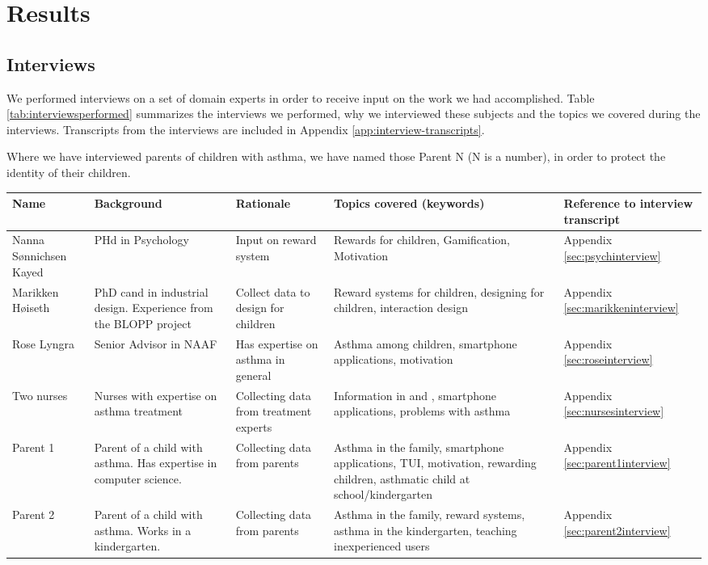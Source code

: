 \chapter{Results}
\label{chp:results}

\section{Interviews}
\label{sec:interviewresults}

We performed interviews on a set of domain experts in order to receive input on the work we had accomplished. Table \ref{tab:interviewsperformed} summarizes the interviews we performed, why we interviewed these subjects and the topics we covered during the interviews. Transcripts from the interviews are included in Appendix \ref{app:interview-transcripts}. 


Where we have interviewed parents of children with asthma, we have named those Parent N (N is a number), in order to protect the identity of their children.  

\begin{sidewaystable}
\centering
\begin{tabular}{| p{3.0cm} | p{4.0cm} | p{3.5cm} | p{6.0cm} | p{2.5cm} |}
	\hline
	\textbf{Name} & \textbf{Background} & \textbf{Rationale} & \textbf{Topics covered (keywords)} & \textbf{Reference to interview transcript} \\
	\hline
	Nanna S\o nnichsen Kayed & PHd in Psychology & Input on reward system & Rewards for children, Gamification, Motivation & Appendix \ref{sec:psychinterview} \\
	\hline
	Marikken H\o iseth & PhD cand in industrial design. Experience from the BLOPP project & Collect data to design for children & Reward systems for children, designing for children, interaction design & Appendix \ref{sec:marikkeninterview} \\
	\hline
	Rose Lyngra & Senior Advisor in NAAF & Has expertise on asthma in general & Asthma among children, smartphone applications, motivation & Appendix \ref{sec:roseinterview} \\
	\hline
	Two nurses & Nurses with expertise on asthma treatment & Collecting data from treatment experts &Information in \ab{} and \app{}, smartphone applications, problems with asthma & Appendix \ref{sec:nursesinterview} \\
	\hline
	Parent 1 & Parent of a child with asthma. Has expertise in computer science. & Collecting data from parents & Asthma in the family, smartphone applications, TUI, motivation, rewarding children, asthmatic child at school/kindergarten & Appendix \ref{sec:parent1interview} \\
	\hline
	Parent 2 & Parent of a child with asthma. Works in a kindergarten. & Collecting data from parents & Asthma in the family, reward systems, asthma in the kindergarten, teaching inexperienced users & Appendix \ref{sec:parent2interview} \\
	\hline     
\end{tabular}
\caption{Interviews performed during the project}
\label{tab:interviewsperformed}
\end{sidewaystable}  

